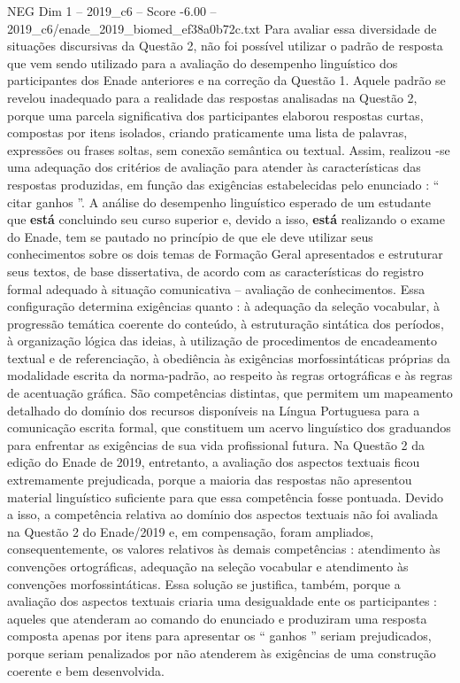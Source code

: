 \begin{textsample}{NEG Dim 1 – 2019\_c6 – Score -6.00 – 2019\_c6/enade\_2019\_biomed\_ef38a0b72c.txt}
Para avaliar essa diversidade de situações discursivas da Questão 2, não foi possível utilizar o padrão de resposta que vem sendo utilizado para a avaliação do desempenho linguístico dos participantes dos Enade anteriores e na correção da Questão 1.
Aquele padrão se revelou inadequado para a realidade das respostas analisadas na Questão 2, porque uma parcela significativa dos participantes elaborou respostas curtas, compostas por itens isolados, criando praticamente uma lista de palavras, expressões ou frases soltas, sem conexão semântica ou textual.
Assim, realizou -se uma adequação dos critérios de avaliação para atender às características das respostas produzidas, em função das exigências estabelecidas pelo enunciado : “ citar ganhos ”.
A análise do desempenho linguístico esperado de um estudante que \textbf{está} concluindo seu curso superior e, devido a isso, \textbf{está} realizando o exame do Enade, tem se pautado no princípio de que ele deve utilizar seus conhecimentos sobre os dois temas de Formação Geral apresentados e estruturar seus textos, de base dissertativa, de acordo com as características do registro formal adequado à situação comunicativa – avaliação de conhecimentos.
Essa configuração determina exigências quanto : à adequação da seleção vocabular, à progressão temática coerente do conteúdo, à estruturação sintática dos períodos, à organização lógica das ideias, à utilização de procedimentos de encadeamento textual e de referenciação, à obediência às exigências morfossintáticas próprias da modalidade escrita da norma-padrão, ao respeito às regras ortográficas e às regras de acentuação gráfica.
São competências distintas, que permitem um mapeamento detalhado do domínio dos recursos disponíveis na Língua Portuguesa para a comunicação escrita formal, que constituem um acervo linguístico dos graduandos para enfrentar as exigências de sua vida profissional futura.
Na Questão 2 da edição do Enade de 2019, entretanto, a avaliação dos aspectos textuais ficou extremamente prejudicada, porque a maioria das respostas não apresentou material linguístico suficiente para que essa competência fosse pontuada.
Devido a isso, a competência relativa ao domínio dos aspectos textuais não foi avaliada na Questão 2 do Enade/2019 e, em compensação, foram ampliados, consequentemente, os valores relativos às demais competências : atendimento às convenções ortográficas, adequação na seleção vocabular e atendimento às convenções morfossintáticas.
Essa solução se justifica, também, porque a avaliação dos aspectos textuais criaria uma desigualdade ente os participantes : aqueles que atenderam ao comando do enunciado e produziram uma resposta composta apenas por itens para apresentar os “ ganhos ” seriam prejudicados, porque seriam penalizados por não atenderem às exigências de uma construção coerente e bem desenvolvida.

\end{textsample}
